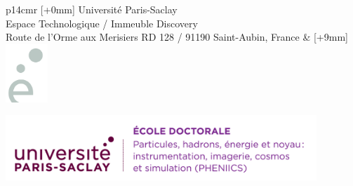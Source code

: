 \vspace{7cm} %
\selectfont
\begin{tabular}{p{14cm}r}
	[+0mm]{{\color{Prune} Université Paris-Saclay\\
			Espace Technologique / Immeuble Discovery\\
			Route de l’Orme aux Merisiers RD 128 / 91190 Saint-Aubin, France}} & [+9mm]{\includegraphics[height=2.19cm]{e.png}}\\
\end{tabular}



\newpage


\noindent 
\includegraphics[height=2.45cm]{EDpic}
\vspace{1cm}

